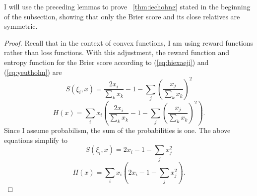 \documentclass[12pt]{article}
\begin{document}

I will use the preceding lemmas to prove {\heorem}~\ref{thm:iechohng}
stated in the beginning of the subsection, showing that only the Brier
score and its close relatives are symmetric.

\begin{proof}
  \label{prf:quojeebo}
  Recall that in the context of convex
  functions, I am using reward functions rather than loss functions.
  With this adjustment, the reward function and entropy function for
  the Brier score according to (\ref{eq:hiexaeji}) and
  (\ref{eq:yeuthohn}) are
\begin{equation}
  \label{eq:lethaiqu}
    S(\xi_{i},x)=\frac{2x_{i}}{\sum_{k}x_{k}}-1-\sum_{j}\left(\frac{x_{j}}{\sum_{k}x_{k}}\right)^{2}
\end{equation}
\begin{equation}
  \label{eq:iviniewe}
    H(x)=\sum_{i}{}x_{i}\left(\frac{2x_{i}}{\sum_{k}x_{k}}-1-\sum_{j}\left(\frac{x_{j}}{\sum_{k}x_{k}}\right)^2\right).
\end{equation}
Since I assume probabilism, the sum of the probabilities is one. The
above equations simplify to
\begin{equation}
  \label{eq:doteeboo}
    S(\xi_{i},x)=2x_{i}-1-\sum_{j}x_{j}^{2}
\end{equation}
\begin{equation}
  \label{eq:piihieri}
    H(x)=\sum_{i}{}x_{i}\left(2x_{i}-1-\sum_{j}x_{j}^{2}\right).
\end{equation}


\end{proof}
\end{document}
